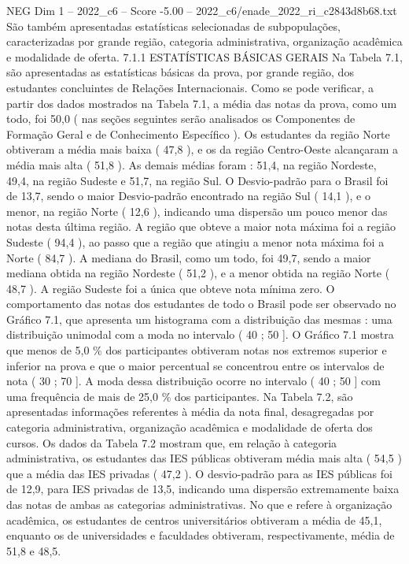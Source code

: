 \begin{textsample}{NEG Dim 1 – 2022\_c6 – Score -5.00 – 2022\_c6/enade\_2022\_ri\_c2843d8b68.txt}
São também apresentadas estatísticas selecionadas de subpopulações, caracterizadas por grande região, categoria administrativa, organização acadêmica e modalidade de oferta. 7.1.1 ESTATÍSTICAS BÁSICAS GERAIS Na Tabela 7.1, são apresentadas as estatísticas básicas da prova, por grande região, dos estudantes concluintes de Relações Internacionais.
Como se pode verificar, a partir dos dados mostrados na Tabela 7.1, a média das notas da prova, como um todo, foi 50,0 ( nas seções seguintes serão analisados os Componentes de Formação Geral e de Conhecimento Específico ).
Os estudantes da região Norte obtiveram a média mais baixa ( 47,8 ), e os da região Centro-Oeste alcançaram a média mais alta ( 51,8 ).
As demais médias foram : 51,4, na região Nordeste, 49,4, na região Sudeste e 51,7, na região Sul.
O Desvio-padrão para o Brasil foi de 13,7, sendo o maior Desvio-padrão encontrado na região Sul ( 14,1 ), e o menor, na região Norte ( 12,6 ), indicando uma dispersão um pouco menor das notas desta última região.
A região que obteve a maior nota máxima foi a região Sudeste ( 94,4 ), ao passo que a região que atingiu a menor nota máxima foi a Norte ( 84,7 ).
A mediana do Brasil, como um todo, foi 49,7, sendo a maior mediana obtida na região Nordeste ( 51,2 ), e a menor obtida na região Norte ( 48,7 ).
A região Sudeste foi a única que obteve nota mínima zero.
O comportamento das notas dos estudantes de todo o Brasil pode ser observado no Gráfico 7.1, que apresenta um histograma com a distribuição das mesmas : uma distribuição unimodal com a moda no intervalo ( 40 ; 50 ].
O Gráfico 7.1 mostra que menos de 5,0 \% dos participantes obtiveram notas nos extremos superior e inferior na prova e que o maior percentual se concentrou entre os intervalos de nota ( 30 ; 70 ].
A moda dessa distribuição ocorre no intervalo ( 40 ; 50 ] com uma frequência de mais de 25,0 \% dos participantes.
Na Tabela 7.2, são apresentadas informações referentes à média da nota final, desagregadas por categoria administrativa, organização acadêmica e modalidade de oferta dos cursos.
Os dados da Tabela 7.2 mostram que, em relação à categoria administrativa, os estudantes das IES públicas obtiveram média mais alta ( 54,5 ) que a média das IES privadas ( 47,2 ).
O desvio-padrão para as IES públicas foi de 12,9, para IES privadas de 13,5, indicando uma dispersão extremamente baixa das notas de ambas as categorias administrativas.
No que e refere à organização acadêmica, os estudantes de centros universitários obtiveram a média de 45,1, enquanto os de universidades e faculdades obtiveram, respectivamente, média de 51,8 e 48,5.

\end{textsample}
